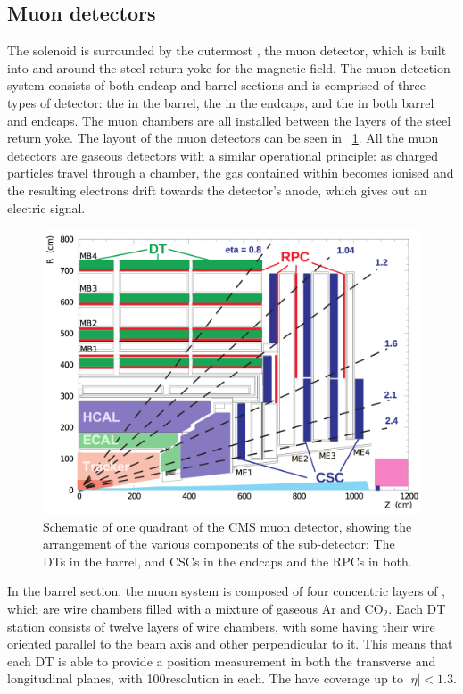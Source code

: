 \subsection{Muon detectors}
\label{sec:cms:muondetector}

The solenoid is surrounded by the outermost \subdetector, the muon detector, which is built into and around the steel return yoke for the magnetic field.
The \CMS muon detection system consists of both endcap and barrel sections and is comprised of three types of detector: the \DTs in the barrel, the \CSCs in the endcaps, and the \RPCs in both barrel and endcaps. The muon chambers are all installed between the layers of the steel return yoke. The layout of the muon detectors can be seen in \Fig~\ref{fig:muonssystem}. All the muon detectors are gaseous detectors with a similar operational principle: as charged particles travel through a chamber, the gas contained within becomes ionised and the resulting electrons drift towards the detector's anode, which gives out an electric signal. 
\begin{figure}[h]
\centering
\includegraphics[width=1.0\textwidth]{detectorFigures/cmsMuonSystem.png}
\caption{Schematic \crosssection of one quadrant of the CMS muon detector, showing the arrangement of the various components of the sub-detector: The DTs in the barrel, and CSCs in the endcaps and the RPCs in both. \cite{MuonReco}.}
\label{fig:muonssystem}
\end{figure}

 In the barrel section, the muon system is composed of four concentric layers of \DTs, which are wire chambers filled with a mixture of gaseous Ar and CO$_{2}$. Each DT station consists of twelve layers of wire chambers, with some having their wire oriented parallel to the beam axis and other perpendicular to it. This means that each DT is able to provide a position measurement in both the transverse and longitudinal planes, with 100\um resolution in each. The \DTs have coverage up to $|\eta|<1.3$. 

